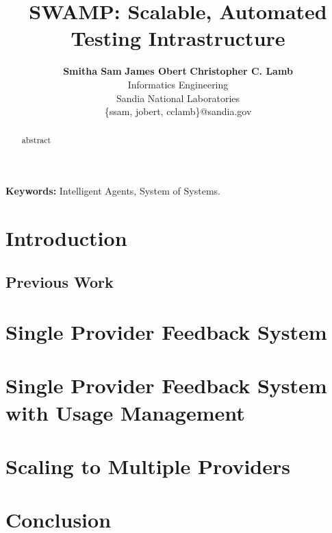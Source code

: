 \documentclass[times, 10pt,twocolumn]{article}
\begin{document}
\title{SWAMP: Scalable, Automated Testing Intrastructure}

\author{
        \textbf{Smitha Sam}\hspace*{0.1in}
        \textbf{James Obert}\hspace*{0.1in}
        \textbf{Christopher C. Lamb}\\
        Informatics Engineering \\
        Sandia National Laboratories \\
        \small{\{ssam, jobert, cclamb\}@sandia.gov}
}

\maketitle
\thispagestyle{empty}

\begin{abstract}
abstract
\end{abstract}

{
\setlength{\parindent}{0mm}
\textbf{Keywords:} Intelligent Agents, System of Systems.
}

\section{Introduction}


\subsection{Previous Work}


\section{Single Provider Feedback System}\label{sec:single}


\section{Single Provider Feedback System with Usage Management}\label{sec:singleUm}


\section{Scaling to Multiple Providers}\label{sec:multiple}


\section{Conclusion}




\end{document}
